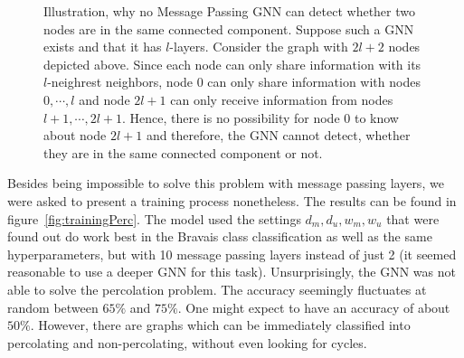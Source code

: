\begin{figure}
    \centering
    \caption{Illustration, why no Message Passing GNN can detect whether two nodes are in the same connected component. 
    Suppose such a GNN exists and that it has $l$-layers. Consider the graph with $2l+2$ nodes depicted above. 
    Since each node can only share information with its $l$-neighrest neighbors, 
    node 0 can only share information with nodes $0,\cdots,l$
    and node $2l+1$ can only receive information from nodes $l+1,\cdots,2l+1$. 
    Hence, there is no possibility for node $0$ to know about node $2l+1$ and 
    therefore, the GNN cannot detect, whether they are in the same connected component or not.}
    \label{fig:gnn_connectedComponent}
\end{figure}
Besides being impossible to solve this problem with message passing layers, we were asked to present a training process nonetheless. 
The results can be found in figure~\ref{fig:trainingPerc}. 
The model used the settings $d_m, d_u, w_m, w_u$ that were found out do work best in the Bravais class classification as well as the same hyperparameters, 
but with 10 message passing layers instead of just 2 (it seemed reasonable to use a deeper GNN for this task). 
Unsurprisingly, the GNN was not able to solve the percolation problem. 
The accuracy seemingly fluctuates at random between $65\%$ and $75\%$. One might expect to have an accuracy of about $50\%$. 
However, there are graphs which can be immediately classified into percolating and non-percolating, without even looking for cycles. 
